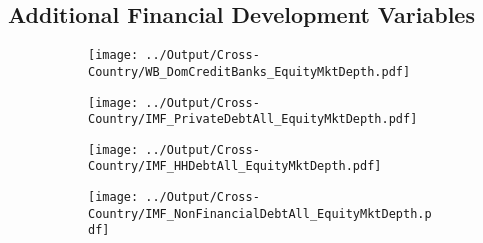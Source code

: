 \documentclass[12pt,notitlepage]{article}
\begin{document}
\begin{table}[!htpb]
\end{table}

\clearpage








\subsection{Additional Financial Development Variables}

\begin{figure}[!htpb]
 \caption{Equity Market Depth (WB) and Financial Development Variables}
\centering
\begin{subfigure}{.49\textwidth}
    \centering
 \texttt{[image: ../Output/Cross-Country/WB\_DomCreditBanks\_EquityMktDepth.pdf]}
\end{subfigure}%
\begin{subfigure}{.49\textwidth}
    \centering
 \texttt{[image: ../Output/Cross-Country/IMF\_PrivateDebtAll\_EquityMktDepth.pdf]}
\end{subfigure}
\begin{subfigure}{.49\textwidth}
    \centering
 \texttt{[image: ../Output/Cross-Country/IMF\_HHDebtAll\_EquityMktDepth.pdf]}
\end{subfigure}%
\begin{subfigure}{.49\textwidth}
    \centering
 \texttt{[image: ../Output/Cross-Country/IMF\_NonFinancialDebtAll\_EquityMktDepth.pdf]}
\end{subfigure}
\end{figure}
\end{document}
